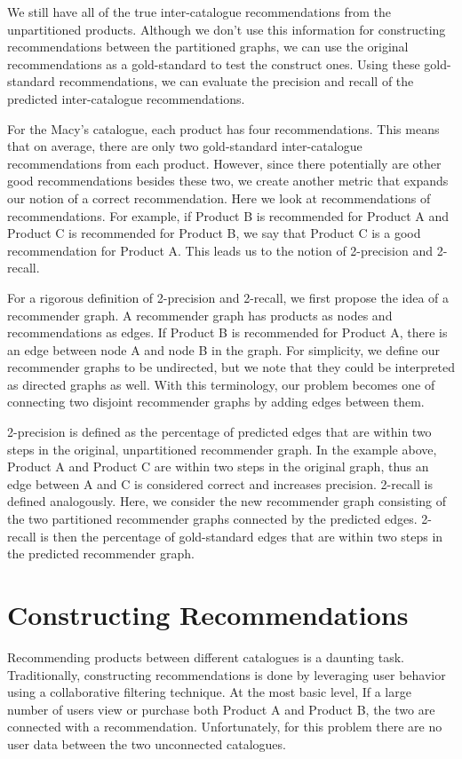 \documentclass[11pt]{article}
\begin{document}
We still have all of the true inter-catalogue recommendations from the
unpartitioned products. Although we don't use this information for constructing
recommendations between the partitioned graphs, we can use the original
recommendations as a gold-standard to test the construct ones. Using these
gold-standard recommendations, we can evaluate the precision and recall of the
predicted inter-catalogue recommendations.

For the Macy's catalogue, each product has four recommendations. This means that
on average, there are only two gold-standard inter-catalogue recommendations
from each product. However, since there potentially are other good
recommendations besides these two, we create another metric that expands our
notion of a correct recommendation. Here we look at recommendations of
recommendations. For example, if Product B is recommended for Product A and
Product C is recommended for Product B, we say that Product C is a good
recommendation for Product A. This leads us to the notion of 2-precision and
2-recall.

For a rigorous definition of 2-precision and 2-recall, we first propose the idea
of a recommender graph. A recommender graph has products as nodes and
recommendations as edges. If Product B is recommended for Product A, there is an
edge between node A and node B in the graph. For simplicity, we define our
recommender graphs to be undirected, but we note that they could be interpreted
as directed graphs as well. With this terminology, our problem becomes one of
connecting two disjoint recommender graphs by adding edges between them. 

2-precision is defined as the percentage of predicted edges that are within two
steps in the original, unpartitioned recommender graph. In the example above,
Product A and Product C are within two steps in the original graph, thus an edge
between A and C is considered correct and increases precision. 2-recall is
defined analogously. Here, we consider the new recommender graph consisting of
the two partitioned recommender graphs connected by the predicted edges.
2-recall is then the percentage of gold-standard edges that are within two steps
in the predicted recommender graph.

\section*{Constructing Recommendations}
Recommending products between different catalogues is a daunting task.
Traditionally, constructing recommendations is done by leveraging user behavior
using a collaborative filtering technique. At the most basic level, If a large
number of users view or purchase both Product A and Product B, the two are
connected with a recommendation. Unfortunately, for this problem there are no
user data between the two unconnected catalogues.
\end{document}
